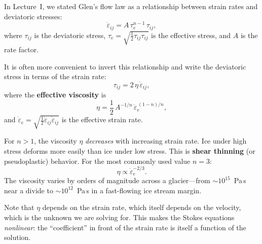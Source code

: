 \documentclass[11pt]{article}
\begin{document}
In Lecture~I, we stated Glen's flow law as a relationship between strain rates and deviatoric stresses:
\begin{equation}
  \dot{\varepsilon}_{ij} = A\,\tau_e^{n-1}\,\tau_{ij},
  \label{eq:glen_forward}
\end{equation}
where $\tau_{ij}$ is the deviatoric stress, $\tau_e = \sqrt{\frac{1}{2}\tau_{ij}\tau_{ij}}$ is the effective stress, and $A$ is the rate factor.

\medskip
\noindent It is often more convenient to invert this relationship and write the deviatoric stress in terms of the strain rate:
\begin{equation}
  \tau_{ij} = 2\,\eta\,\dot{\varepsilon}_{ij},
  \label{eq:glen_viscosity}
\end{equation}
where the \textbf{effective viscosity} is
\begin{equation}
  \boxed{\eta = \frac{1}{2}\,A^{-1/n}\,\dot{\varepsilon}_e^{\,(1-n)/n},}
  \label{eq:viscosity}
\end{equation}
and $\dot{\varepsilon}_e = \sqrt{\frac{1}{2}\dot{\varepsilon}_{ij}\dot{\varepsilon}_{ij}}$ is the effective strain rate.

\begin{tcolorbox}[
  colback=blue!5,
  colframe=blue!50!black,
  title={\textbf{Key point: shear thinning}}
]
For $n > 1$, the viscosity $\eta$ \emph{decreases} with increasing strain rate.  Ice under high stress deforms more easily than ice under low stress.  This is \textbf{shear thinning} (or pseudoplastic) behavior.  For the most commonly used value $n = 3$:
\begin{equation}
  \eta \propto \dot{\varepsilon}_e^{-2/3}.
\end{equation}
The viscosity varies by orders of magnitude across a glacier---from $\sim 10^{15}$~Pa\,s near a divide to $\sim 10^{12}$~Pa\,s in a fast-flowing ice stream margin.
\end{tcolorbox}

\noindent Note that $\eta$ depends on the strain rate, which itself depends on the velocity, which is the unknown we are solving for.  This makes the Stokes equations \emph{nonlinear}: the ``coefficient'' in front of the strain rate is itself a function of the solution.

\end{document}
